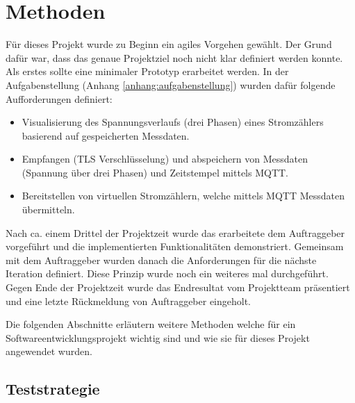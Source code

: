 \chapter{Methoden}
\label{methoden}
Für dieses Projekt wurde zu Beginn ein agiles Vorgehen gewählt.
Der Grund dafür war, dass das genaue Projektziel noch nicht klar definiert werden konnte.
Als erstes sollte eine minimaler Prototyp erarbeitet werden. In der Aufgabenstellung (Anhang \ref{anhang:aufgabenstellung}) wurden dafür folgende Aufforderungen definiert:
\begin{itemize}
    \item Visualisierung des Spannungsverlaufs (drei Phasen) eines Stromzählers
          basierend auf gespeicherten Messdaten.
    \item Empfangen (TLS Verschlüsselung) und abspeichern von Messdaten (Spannung über drei Phasen) und
          Zeitstempel mittels MQTT.
    \item Bereitstellen von virtuellen Stromzählern, welche mittels MQTT Messdaten
          übermitteln.
\end{itemize}
Nach ca. einem Drittel der Projektzeit wurde das erarbeitete dem Auftraggeber vorgeführt und die implementierten Funktionalitäten demonstriert.
Gemeinsam mit dem Auftraggeber wurden danach die Anforderungen für die nächste Iteration definiert.
Diese Prinzip wurde noch ein weiteres mal durchgeführt.
Gegen Ende der Projektzeit wurde das Endresultat vom Projektteam präsentiert und eine letzte Rückmeldung von Auftraggeber eingeholt.



Die folgenden Abschnitte erläutern weitere Methoden welche für ein Softwareentwicklungsprojekt
wichtig sind und wie sie für dieses Projekt angewendet wurden.


\section{Teststrategie}
\label{teststrategie}

